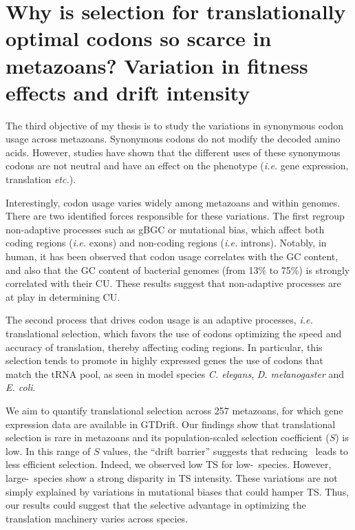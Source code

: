 
    \thispagestyle{empty}
    
    \chapter[Why is selection for translationally optimal codons so scarce in metazoans? Variation in fitness effects and drift intensity]{Why is selection for translationally optimal codons so scarce in metazoans? Variation in fitness effects and drift intensity}
    \label{chap:CodonUsage}
    
    \vspace*{30pt}

    The third objective of my thesis is to study the variations in synonymous codon usage across metazoans. Synonymous codons do not modify the decoded amino acids. However, studies have shown that the different uses of these synonymous codons are not neutral and have an effect on the phenotype (\textit{i.e.} gene expression, translation \textit{etc.}).
    
    Interestingly, codon usage varies widely among metazoans and within genomes. There are two identified forces responsible for these variations. The first regroup non-adaptive processes such as gBGC or mutational bias, which affect both coding regions (\textit{i.e.} exons) and non-coding regions (\textit{i.e.} introns). Notably, in human, it has been observed that codon usage correlates with the GC content, and also that the GC content of bacterial genomes (from 13\% to 75\%) is strongly correlated with their CU. These results suggest that non-adaptive processes are at play in determining CU.
    
    The second process that drives codon usage is an adaptive processes, \textit{i.e.} translational selection, which favors the use of codons optimizing the speed and accuracy of translation, thereby affecting coding regions. In particular, this selection tends to promote in highly expressed genes the use of codons that match the tRNA pool, as seen in model species \textit{C. elegans}, \textit{D. melanogaster} and \textit{E. coli}.

    We aim to quantify translational selection across 257 metazoans, for which gene expression data are available in GTDrift. Our findings show that translational selection is rare in metazoans and its population-scaled selection coefficient ($S$) is low. In this range of $S$ values, the “drift barrier” suggests that reducing \Ne~leads to less efficient selection. Indeed, we observed low TS for low-\Ne~species. However, large-\Ne~species show a strong disparity in TS intensity. These variations are not simply explained by variations in mutational biases that could hamper TS. Thus, our results could suggest that the selective advantage in optimizing the translation machinery varies across species.

